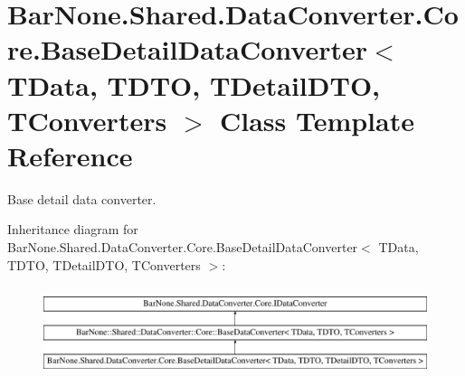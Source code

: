 \hypertarget{class_bar_none_1_1_shared_1_1_data_converter_1_1_core_1_1_base_detail_data_converter}{}\section{Bar\+None.\+Shared.\+Data\+Converter.\+Core.\+Base\+Detail\+Data\+Converter$<$ T\+Data, T\+D\+TO, T\+Detail\+D\+TO, T\+Converters $>$ Class Template Reference}
\label{class_bar_none_1_1_shared_1_1_data_converter_1_1_core_1_1_base_detail_data_converter}


Base detail data converter.  


Inheritance diagram for Bar\+None.\+Shared.\+Data\+Converter.\+Core.\+Base\+Detail\+Data\+Converter$<$ T\+Data, T\+D\+TO, T\+Detail\+D\+TO, T\+Converters $>$\+:\begin{figure}[H]
\begin{center}
\leavevmode
\includegraphics[height=2.654028cm]{class_bar_none_1_1_shared_1_1_data_converter_1_1_core_1_1_base_detail_data_converter}
\end{center}
\end{figure}
